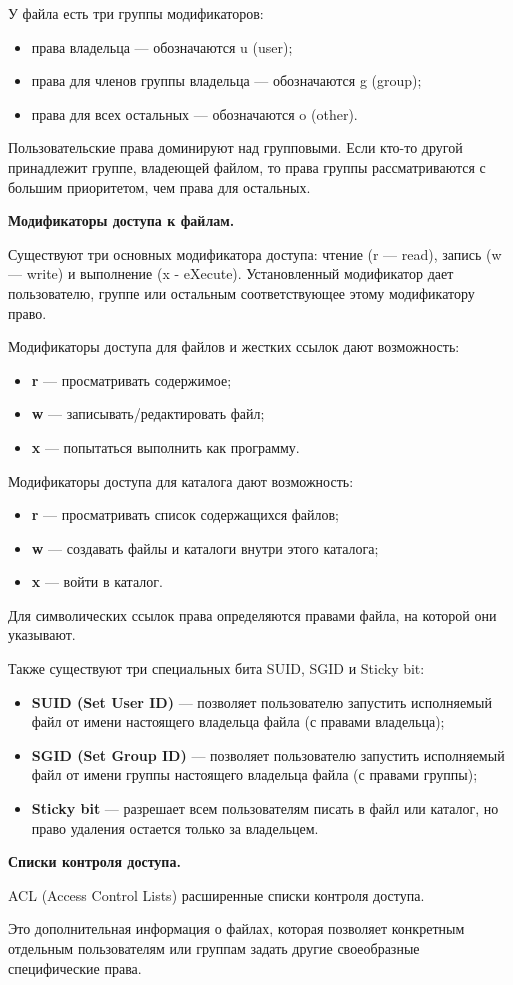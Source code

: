 У файла есть три группы модификаторов:

\begin{itemize}
	\item права владельца --- обозначаются u (user);

	\item права для членов группы владельца --- обозначаются g (group);

	\item права для всех остальных --- обозначаются o (other).
\end{itemize}

Пользовательские права доминируют над групповыми. Если кто-то другой принадлежит группе, владеющей файлом, то права группы рассматриваются с большим приоритетом, чем права для остальных. 

\textbf{Модификаторы доступа к файлам.}

Существуют три основных модификатора доступа: чтение (r — read), запись (w — write) и выполнение (x - eXecute). Установленный модификатор дает пользователю, группе или остальным соответствующее этому модификатору право.

Модификаторы доступа для файлов и жестких ссылок дают возможность:

\begin{itemize}
	\item \textbf{r} — просматривать содержимое;
	\item \textbf{w} — записывать/редактировать файл;
	\item \textbf{x} — попытаться выполнить как программу.
\end{itemize}

Модификаторы доступа для каталога дают возможность:

\begin{itemize}
	\item \textbf{r} — просматривать список содержащихся файлов;
	\item \textbf{w} — создавать файлы и каталоги внутри этого каталога;
	\item \textbf{x} — войти в каталог.
\end{itemize}
Для символических ссылок права определяются правами файла, на которой они указывают.


Также существуют три специальных бита SUID, SGID и Sticky bit: 

\begin{itemize}
	\item \textbf{SUID (Set User ID)} — позволяет пользователю запустить исполняемый файл от имени настоящего владельца файла (с правами владельца);

	\item \textbf{SGID (Set Group ID)} — позволяет пользователю запустить исполняемый файл от имени группы настоящего владельца файла (с правами группы);

	\item \textbf{Sticky bit} — разрешает всем пользователям писать в файл или каталог, но право удаления остается только за владельцем.
\end{itemize}


\textbf{Списки контроля доступа.}

\begin{defi}{ACL (Access Control Lists)}
	расширенные списки контроля доступа.
\end{defi}

Это дополнительная информация о файлах, которая позволяет конкретным отдельным пользователям или группам задать другие своеобразные специфические права. 